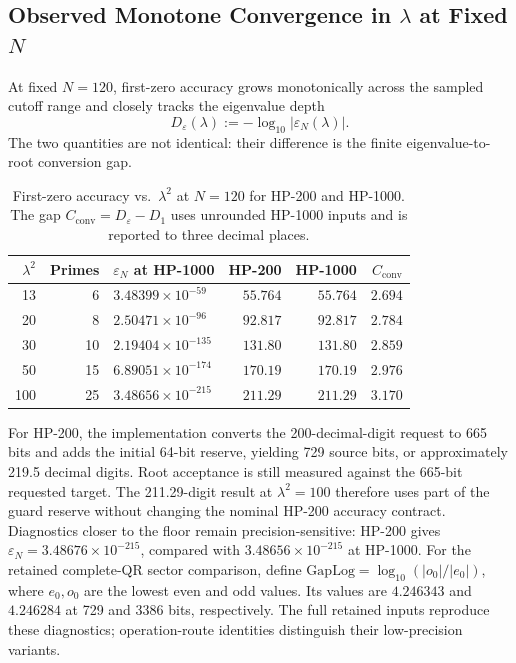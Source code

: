\documentclass[11pt,a4paper]{article}
\begin{document}
\subsection{\texorpdfstring{Observed Monotone Convergence in $\lambda$ at Fixed $N$}
{Observed Monotone Convergence in lambda at Fixed N}}
\label{sec:lambda_convergence}

At fixed $N=120$, first-zero accuracy grows monotonically across the
sampled cutoff range and closely tracks the eigenvalue depth
\[
D_{\varepsilon}(\lambda):=-\log_{10}|\varepsilon_N(\lambda)|.
\]
The two quantities are not identical: their difference is the
finite eigenvalue-to-root conversion gap.

\begin{table}[!htbp]
\centering
\small
\caption{First-zero accuracy vs.\ $\lambda^2$ at $N=120$ for HP-200 and HP-1000.
The gap $C_{\mathrm{conv}}=D_{\varepsilon}-D_1$ uses unrounded HP-1000 inputs
and is reported to three decimal places.}
\label{tab:lambda_sweep}
\begin{tabular}{@{}rrlrrr@{}}
\toprule
$\lambda^2$ & Primes & $\varepsilon_N$ at HP-1000 & HP-200 & HP-1000 & $C_{\mathrm{conv}}$ \\
\midrule
13  & 6  & $3.48399\times10^{-59}$  & $55.764$ & $55.764$ & $2.694$ \\
20  & 8  & $2.50471\times10^{-96}$  & $92.817$ & $92.817$ & $2.784$ \\
30  & 10 & $2.19404\times10^{-135}$ & $131.80$ & $131.80$ & $2.859$ \\
50  & 15 & $6.89051\times10^{-174}$ & $170.19$ & $170.19$ & $2.976$ \\
100 & 25 & $3.48656\times10^{-215}$ & $211.29$ & $211.29$ & $3.170$ \\
\bottomrule
\end{tabular}
\normalsize
\end{table}

For HP-200, the implementation converts the 200-decimal-digit request
to 665 bits and adds the initial 64-bit reserve, yielding 729 source bits, or
approximately 219.5 decimal digits. Root acceptance is still measured
against the 665-bit requested target. The 211.29-digit result at
$\lambda^2=100$ therefore uses part of the guard reserve without
changing the nominal HP-200 accuracy contract. Diagnostics closer to
the floor remain precision-sensitive: HP-200 gives
$\varepsilon_N=3.48676\times10^{-215}$, compared with
$3.48656\times10^{-215}$ at HP-1000. For the retained complete-QR sector comparison, define
$\mathrm{GapLog}=\log_{10}(|o_0|/|e_0|)$, where $e_0,o_0$ are the
lowest even and odd values. Its values are $4.246343$ and $4.246284$
at 729 and 3386 bits, respectively. The full retained inputs reproduce
these diagnostics; operation-route identities distinguish their
low-precision variants.
\end{document}
